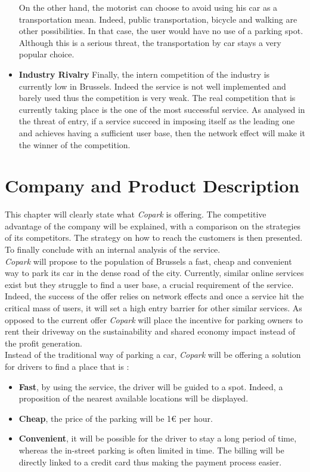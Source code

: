 \documentclass[12pt,a4paper,oneside]{book}
\newcommand{\bp}{\textit{Copark}}
\begin{document}
\begin{itemize}
On the other hand, the motorist can choose to avoid using his car as a transportation mean. Indeed, public transportation, bicycle and walking are other possibilities. In that case, the user would have no use of a parking spot. Although this is a serious threat, the transportation by car stays a very popular choice.
\item \textbf{Industry Rivalry} Finally, the intern competition of the industry is currently low in Brussels. Indeed the service is not well implemented and barely used thus the competition is very weak. The real competition that is currently taking place is the one of the most successful service. As analysed in the threat of entry, if a service succeed in imposing itself as the leading one and achieves  having a sufficient user base, then the network effect will make it the winner of the competition.
\end{itemize}

\chapter{Company and Product Description}
\label{cpdch}

This chapter will clearly state what \bp{} is offering. The competitive advantage of the company will be explained, with a comparison on the strategies of its competitors. The strategy on how to reach the customers is then presented. To finally conclude with an internal analysis of the service.\\

\bp{} will propose to the population of Brussels a fast, cheap and convenient way to park its car in the dense road of the city. Currently, similar online services exist but they struggle to find a user base, a crucial requirement of the service. Indeed, the success of the offer relies on network effects and once a service hit the critical mass of users, it will set a high entry barrier for other similar services. As opposed to the current offer \bp{} will place the incentive for parking owners to rent their driveway on the sustainability and shared economy impact instead of the profit generation.\\

Instead of the traditional way of parking a car, \bp{} will be offering a solution for drivers to find a place that is :
\begin{itemize}
\item \textbf{Fast}, by using the service, the driver will be guided to a spot. Indeed, a proposition of the nearest available locations will be displayed.
\item \textbf{Cheap}, the price of the parking will be 1\euro{} per hour.
\item \textbf{Convenient}, it will be possible for the driver to stay a long period of time, whereas the in-street parking is often limited in time. The billing will be directly linked to a credit card thus making the payment process easier.
\end{itemize} 
\end{document}
